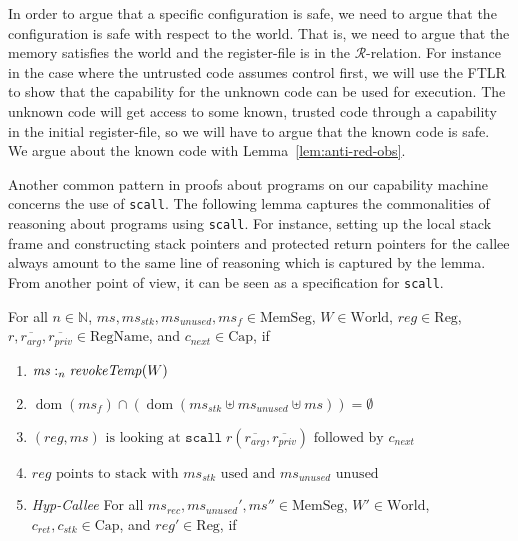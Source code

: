 \documentclass[format=acmsmall, review=true, screen=true]{acmart}
\DeclareMathOperator{\dom}{dom}
\newcommand{\var}[1]{\mathit{#1}}
\newcommand{\hs}{\var{ms}}
\newcommand{\ms}{\hs}
\newcommand{\reg}{\var{reg}}
\newcommand{\heap}{\var{mem}}
\newcommand{\stk}{\var{stk}}
\newcommand{\plainfun}[2]{
  \ifthenelse{\equal{#2}{}}
  {\mathit{#1}}
  {\mathit{#1}(#2)}
}
\newcommand{\revokeTemp}[1]{\plainfun{revokeTemp}{#1}}
\newcommand{\heapSat}[3][\heap]{#1 :_{#2} #3}
\newcommand{\memSat}[3][n]{\heapSat[#2]{#1}{#3}}
\newcommand{\asmType}{\plaindom{AsmType}}
\newcommand{\plaindom}[1]{\mathrm{#1}}
\newcommand{\Caps}{\plaindom{Cap}}
\newcommand{\RegName}{\plaindom{RegName}}
\newcommand{\Regs}{\plaindom{Reg}}
\newcommand{\HeapSegments}{\plaindom{MemSeg}}
\newcommand{\MemSegments}{\HeapSegments}
\newcommand{\nats}{\mathbb{N}}
\newcommand{\Worlds}{\plaindom{World}}
\newcommand{\intr}[2]{\mathcal{#1}}
\newcommand{\regintr}[1]{\intr{R}{#1}}
\newcommand{\stdrr}{\regintr{\asmType}}
\newenvironment{toplas}{}{}
\begin{document}
\begin{toplas}
In order to argue that a specific configuration is safe, we need to argue that the configuration is safe with respect to the world.
That is, we need to argue that the memory satisfies the world and the register-file is in the $\stdrr$-relation.
For instance in the case where the untrusted code assumes control first, we will use the FTLR to show that the capability for the unknown code can be used for execution.
The unknown code will get access to some known, trusted code through a capability in the initial register-file, so we will have to argue that the known code is safe.
We argue about the known code with Lemma~\ref{lem:anti-red-obs}.

Another common pattern in proofs about programs on our capability machine concerns the use of \texttt{scall}.
The following lemma captures the commonalities of reasoning about programs using \texttt{scall}.
For instance, setting up the local stack frame and constructing stack pointers and protected return pointers for the callee always amount to the same line of reasoning which is captured by the lemma.
From another point of view, it can be seen as a specification for \texttt{scall}.
\begin{lemma}
  \label{lem:scall-works}
  For all $n \in \nats$, $\ms, \ms_\stk, \ms_\var{unused}, \ms_f \in \MemSegments$, $W
  \in \Worlds$, $\reg \in \Regs$, $r,\overline{r_{\mathit{arg}}},
  \overline{r_{\mathit{priv}}} \in \RegName$, and $c_\var{next} \in \Caps$,
  if
  \begin{enumerate}
  \item \label{item:scall:memsat} $\memSat[n]{\ms}{\revokeTemp{W}}$ 
  \item $\dom(\ms_f) \cap (\dom(\ms_\stk \uplus \ms_{\mathit{unused}} \uplus \ms)) = \emptyset$
  \item \label{item:scall:stack} $(\reg,\ms) \text{ is looking at }
    \mathtt{scall}\;r(\overline{r_{\mathit{arg}}},
    \overline{r_{\mathit{priv}}}) \text{ followed by }
    c_{\mathit{next}}$
  \item $\reg \text{ points to stack with $\ms_\stk$ used and $\ms_{\mathit{unused}}$ unused}$
  \item \label{item:scall:hyp-callee} \emph{Hyp-Callee} For all  $\ms_\var{rec},
    \ms_\var{unused}', \ms'' \in \MemSegments$, $W' \in \Worlds$, $c_\var{ret},
    c_\stk \in \Caps$, and $\reg' \in \Regs$, if
\end{enumerate}
\end{lemma}
\end{toplas}
\end{document}
